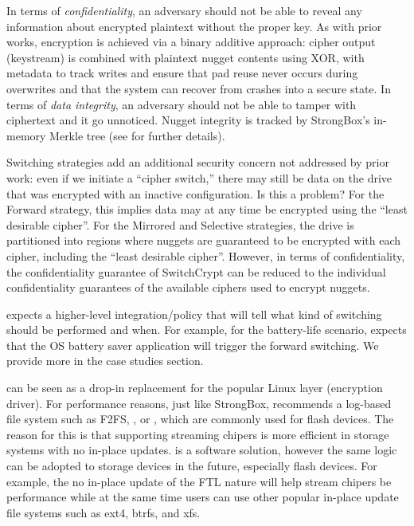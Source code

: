 

In terms of {\em confidentiality}, an adversary should not be able to reveal
any information about encrypted plaintext without the proper key.  As with
prior works, encryption is achieved via a binary additive approach: cipher
output (keystream) is combined with plaintext nugget contents using XOR,
with metadata to track writes and ensure that pad reuse never occurs
during overwrites and that the system can recover from crashes into a
secure state.
In terms of {\em data integrity}, an adversary should not be able to
tamper with ciphertext and it go unnoticed. Nugget integrity is tracked by
StrongBox's in-memory Merkle tree (see \cite[Section \xxx]{StrongBox} for
further details).

Switching strategies add an additional security concern not addressed by
prior work: even if we initiate a ``cipher switch,'' there may still be
data on the drive that was encrypted with an inactive configuration. Is
this a problem? For the Forward strategy, this implies data may at any
time be encrypted using the ``least desirable cipher''. For the Mirrored
and Selective strategies, the drive is partitioned into regions where
nuggets are guaranteed to be encrypted with each cipher, including the
``least desirable cipher''. However, in terms of confidentiality, the
confidentiality guarantee of SwitchCrypt can be reduced to the individual
confidentiality guarantees of the available ciphers used to encrypt
nuggets. 



\sys expects a higher-level integration/policy that will tell \sys what kind of
switching should be performed and when.  For example, for the battery-life scenario,
\sys expects that the OS battery saver application will trigger the forward switching.
We provide more in the case studies section.


%
\sys can be seen as a drop-in replacement for the popular Linux
 layer (encryption driver).  For performance reasons, just
like StrongBox, \sys recommends a log-based file system such as F2FS,
\xxx, or \xxx, which are commonly used for flash devices.  The reason for
this is that supporting streaming chipers is more efficient in storage
systems with no in-place updates.  \sys is a software solution, however
the same logic can be adopted to storage devices in the future, especially
flash devices.  For example, the no in-place update of the FTL nature will
help stream chipers be performance while at the same time users can use
other popular in-place update file systems such as ext4, btrfs, and xfs.



